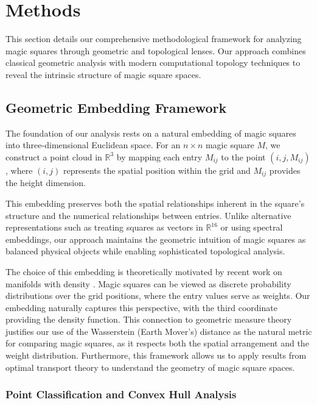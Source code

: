 \section{Methods}\label{sec:methods}

This section details our comprehensive methodological framework for analyzing magic squares through geometric and topological lenses. Our approach combines classical geometric analysis with modern computational topology techniques to reveal the intrinsic structure of magic square spaces.

\subsection{Geometric Embedding Framework}\label{subsec:embedding}

The foundation of our analysis rests on a natural embedding of magic squares into three-dimensional Euclidean space. For an $n \times n$ magic square $M$, we construct a point cloud in $\mathbb{R}^3$ by mapping each entry $M_{ij}$ to the point $(i, j, M_{ij})$, where $(i,j)$ represents the spatial position within the grid and $M_{ij}$ provides the height dimension.

This embedding preserves both the spatial relationships inherent in the square's structure and the numerical relationships between entries. Unlike alternative representations such as treating squares as vectors in $\mathbb{R}^{16}$ or using spectral embeddings, our approach maintains the geometric intuition of magic squares as balanced physical objects while enabling sophisticated topological analysis.

The choice of this embedding is theoretically motivated by recent work on manifolds with density \citep{bunge2020}. Magic squares can be viewed as discrete probability distributions over the grid positions, where the entry values serve as weights. Our embedding naturally captures this perspective, with the third coordinate providing the density function. This connection to geometric measure theory justifies our use of the Wasserstein (Earth Mover's) distance as the natural metric for comparing magic squares, as it respects both the spatial arrangement and the weight distribution. Furthermore, this framework allows us to apply results from optimal transport theory to understand the geometry of magic square spaces.

\subsubsection{Point Classification and Convex Hull Analysis}

